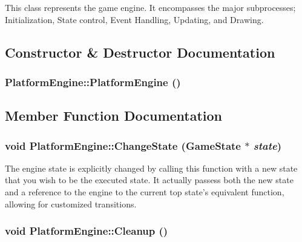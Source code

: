 This class represents the game engine. It encompasses the major subprocesses; Initialization, State control, Event Handling, Updating, and Drawing. 

\subsection{Constructor \& Destructor Documentation}
\hypertarget{class_platform_engine_9d45e2da5a9b7e52d8c5636f70068e11}{
\subsubsection[{PlatformEngine}]{\setlength{\rightskip}{0pt plus 5cm}PlatformEngine::PlatformEngine ()}}
\label{db/da1/class_platform_engine_9d45e2da5a9b7e52d8c5636f70068e11}




\subsection{Member Function Documentation}
\hypertarget{class_platform_engine_d2b335545c9ab6bce7be7c014bc8c528}{
\subsubsection[{ChangeState}]{\setlength{\rightskip}{0pt plus 5cm}void PlatformEngine::ChangeState ({\bf GameState} $\ast$ {\em state})}}
\label{db/da1/class_platform_engine_d2b335545c9ab6bce7be7c014bc8c528}


The engine state is explicitly changed by calling this function with a new state that you wish to be the executed state. It actually passess both the new state and a reference to the engine to the current top state's equivalent function, allowing for customized transitions. \hypertarget{class_platform_engine_361b54312d9ec2fa842cd982f67100f9}{
\subsubsection[{Cleanup}]{\setlength{\rightskip}{0pt plus 5cm}void PlatformEngine::Cleanup ()}}
\label{db/da1/class_platform_engine_361b54312d9ec2fa842cd982f67100f9}


